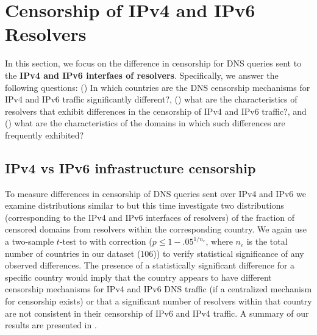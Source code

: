 \section{Censorship of IPv4 and IPv6 Resolvers}
\label{sec:infrastructure}

 In this section, we focus on the difference in censorship
for DNS queries sent to the \textbf{IPv4 and IPv6 interfaes of resolvers}.
%
Specifically, we answer the following questions:
%
() In which countries are the DNS censorship
mechanisms for IPv4 and IPv6 traffic significantly different?,
%
() what are the characteristics of resolvers
that exhibit differences in the censorship of IPv4 and IPv6 traffic?, and
%
() what are the characteristics of the domains
in which such differences are frequently exhibited?

\subsection{IPv4 vs IPv6 infrastructure censorship} \label{sec:infrastructure:country}


%
To measure differences in censorship of DNS queries sent over IPv4 and IPv6 we
examine distributions similar to  but this time
investigate two distributions (corresponding to the IPv4 and IPv6 interfaces of
resolvers) of the fraction of censored domains from resolvers within the
corresponding country.
%
We again use a two-sample $t$-test to with \Sidak correction ($p \leq
1-{.05}^{1/n_{c}}$, where $n_c$ is
the total number of countries in our dataset (106)) to verify statistical
significance of any observed differences.
%
%
The presence of a statistically significant difference for a specific country
would imply that the country appears to have different censorship mechanisms
for IPv4 and IPv6 DNS traffic (if a centralized mechanism for censorship
exists) or that a significant number of resolvers within that country are not
consistent in their censorship of IPv6 and IPv4 traffic.
%
A summary of our results are presented in .

